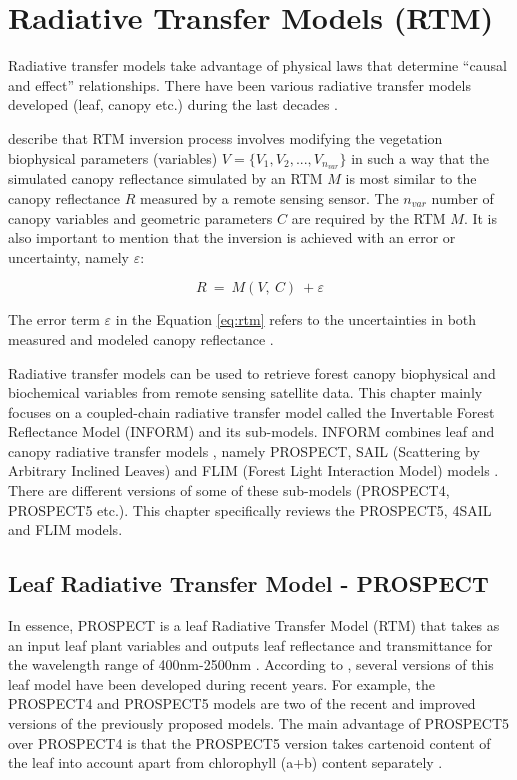 \documentclass[a4paper, twoside]{templates/ociamthesis}
\begin{document}
\hypertarget{rtm}{%
\chapter{Radiative Transfer Models (RTM)}\label{rtm}}

Radiative transfer models take advantage of physical laws that determine ``causal and effect'' relationships. There have been various radiative transfer models developed (leaf, canopy etc.) during the last decades \citep{verrelst2019quantifying}.

\citet{combal2003retrieval} describe that RTM inversion process involves modifying the vegetation biophysical parameters (variables) \(V = \{V_{1}, V_{2}, ..., V_{n_{var}}\}\) in such a way that the simulated canopy reflectance simulated by an RTM \(M\) is most similar to the canopy reflectance \(R\) measured by a remote sensing sensor. The \(n_{var}\) number of canopy variables and geometric parameters \(C\) are required by the RTM \(M\). It is also important to mention that the inversion is achieved with an error or uncertainty, namely \(\varepsilon\):

\begin{equation}
R\ =\ M\left(V,\ C\right)\ +\varepsilon
\label{eq:rtm}
\end{equation}

The error term \(\varepsilon\) in the Equation \eqref{eq:rtm} refers to the uncertainties in both measured and modeled canopy reflectance \citep{combal2003retrieval}.

Radiative transfer models can be used to retrieve forest canopy biophysical and biochemical variables from remote sensing satellite data. This chapter mainly focuses on a coupled-chain radiative transfer model called the Invertable Forest Reflectance Model (INFORM) and its sub-models. INFORM combines leaf and canopy radiative transfer models \citep{atzberger2000development}, namely PROSPECT, SAIL (Scattering by Arbitrary Inclined Leaves) and FLIM (Forest Light Interaction Model) models \citep{schlerf2006inversion}. There are different versions of some of these sub-models (PROSPECT4, PROSPECT5 etc.). This chapter specifically reviews the PROSPECT5, 4SAIL and FLIM models.

\hypertarget{prospect}{%
\section{Leaf Radiative Transfer Model - PROSPECT}\label{prospect}}

In essence, PROSPECT is a leaf Radiative Transfer Model (RTM) that takes as an input leaf plant variables and outputs leaf reflectance and transmittance for the wavelength range of 400nm-2500nm \citep{jacquemoud1990prospect}. According to \citet{yang2021improving}, several versions of this leaf model have been developed during recent years. For example, the PROSPECT4 and PROSPECT5 models are two of the recent and improved versions of the previously proposed models. The main advantage of PROSPECT5 over PROSPECT4 is that the PROSPECT5 version takes cartenoid content of the leaf into account apart from chlorophyll (a+b) content separately \citep{yang2021improving}.
\end{document}
